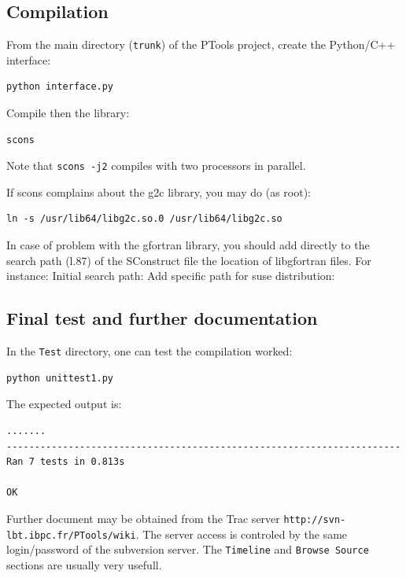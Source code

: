 \documentclass[12pt,a4paper]{article}
\begin{document}
\subsection{Compilation}
From the main directory ({\tt trunk}) of the PTools project, create the Python/C++ interface:
\begin{verbatim}
python interface.py
\end{verbatim}

Compile then the library:
\begin{verbatim}
scons
\end{verbatim}

Note that {\tt scons -j2} compiles with two processors in parallel.

If scons complains about the g2c library, you may do (as root):
\begin{verbatim}
ln -s /usr/lib64/libg2c.so.0 /usr/lib64/libg2c.so
\end{verbatim}

In case of problem with the gfortran library, you should add directly to the search path (l.87)
of the SConstruct file the location of libgfortran files. For instance: 
\newline Initial search path:
\newline Add specific path for suse distribution:

\subsection{Final test and further documentation}

In the {\tt Test} directory, one can test the compilation worked:
\begin{verbatim}
python unittest1.py
\end{verbatim}

The expected output is:
\begin{verbatim}
....... 
---------------------------------------------------------------------- 
Ran 7 tests in 0.813s 

OK 
\end{verbatim}

Further document may be obtained from the Trac server {\tt http://svn-lbt.ibpc.fr/PTools/wiki}. 
The server access is controled by the same login/password of the subversion server. The {\tt Timeline}
and {\tt Browse Source} sections are usually very usefull.
\end{document}
